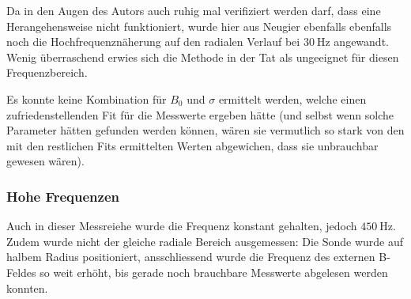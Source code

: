 {	\begin{minipage}[t]{0.33\textwidth}
        \vspace{0mm}
        Da in  den Augen des  Autors auch  ruhig mal verifiziert  werden darf,
        dass eine Herangehensweise nicht  funktioniert, wurde hier aus Neugier
        ebenfalls ebenfalls  noch die Hochfrequenzn\"aherung auf  den radialen
        Verlauf   bei  $\SI{30}{\hertz}$   angewandt.   Wenig   \"uberraschend
        erwies  sich  die Methode  in  der  Tat  als ungeeignet  f\"ur  diesen
        Frequenzbereich.

        Es konnte keine Kombination f\"ur $B_0$ und $\sigma$ ermittelt werden,
        welche  einen  zufriedenstellenden  Fit f\"ur  die  Messwerte  ergeben
        h\"atte  (und  selbst wenn  solche Parameter h\"atten  gefunden werden
        k\"onnen, w\"aren sie  vermutlich so stark von den  mit den restlichen
        Fits  ermittelten  Werten  abgewichen, dass  sie  unbrauchbar  gewesen
        w\"aren).
	\end{minipage}%
	\begin{minipage}[t]{0.67\textwidth}
        \vspace{0mm}
        \hfill
        \resizebox{.95\textwidth}{!}{}
        \label{fig:alu:rad:approx:low}
	\end{minipage}


    \subsubsection{Hohe Frequenzen}
    \label{sec:ausw:subsec:vollz:subsubsec:highfreq}

	\begin{minipage}[t]{0.33\textwidth}
        \vspace{0mm}
        Auch  in  dieser  Messreiehe  wurde die  Frequenz  konstant  gehalten,
        jedoch  $\SI{450}{\hertz}$. Zudem  wurde  nicht  der  gleiche  radiale
        Bereich ausgemessen: Die  Sonde wurde auf halbem  Radius positioniert,
        ansschliessend  wurde  die  Frequenz  des externen  B-Feldes  so  weit
        erh\"oht,  bis  gerade  noch  brauchbare  Messwerte  abgelesen  werden
        konnten.


\end{minipage}}
